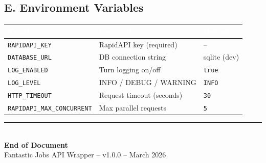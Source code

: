 \documentclass[11pt, a4paper]{article}
\begin{document}
\subsection{E. Environment Variables}

\begin{center}\small
\begin{tabularx}{\textwidth}{|L{4cm}|X|L{3cm}|}
\hline
{}
\textcolor{white}{\textbf{Variable}} & \textcolor{white}{\textbf{Description}} & \textcolor{white}{\textbf{Default}} \\
\hline
\texttt{RAPIDAPI\_KEY} & RapidAPI key (required) & -- \\
\texttt{DATABASE\_URL} & DB connection string & sqlite (dev) \\
\texttt{LOG\_ENABLED} & Turn logging on/off & \texttt{true} \\
\texttt{LOG\_LEVEL} & INFO / DEBUG / WARNING & \texttt{INFO} \\
\texttt{HTTP\_TIMEOUT} & Request timeout (seconds) & \texttt{30} \\
\texttt{RAPIDAPI\_MAX\_CONCURRENT} & Max parallel requests & \texttt{5} \\
\hline
\end{tabularx}
\end{center}

\vfill
\begin{center}
\textcolor{highlight}{\rule{8cm}{2pt}}\\[0.5cm]
{\large\color{primary}\textbf{End of Document}}\\[0.3cm]
{\small\color{accent}Fantastic Jobs API Wrapper -- v1.0.0 -- March 2026}
\end{center}
\end{document}
